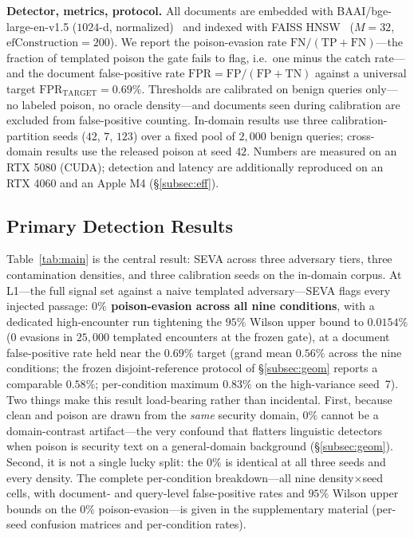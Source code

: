 \documentclass[conference]{IEEEtran}
\begin{document}
\noindent\textbf{Detector, metrics, protocol.} All documents are embedded with
BAAI/bge-large-en-v1.5 ($1024$-d, normalized)~\cite{bge} and indexed with FAISS
HNSW~\cite{faiss,hnsw} ($M=32$, $\mathrm{efConstruction}=200$). We report the
poison-evasion rate $\mathrm{FN}/(\mathrm{TP}+\mathrm{FN})$---the fraction of
templated poison the gate fails to flag, i.e.\ one minus the catch rate---and the
document false-positive rate $\mathrm{FPR}=\mathrm{FP}/(\mathrm{FP}+\mathrm{TN})$
against a universal target $\mathrm{FPR}_{\mathrm{TARGET}}=0.69\%$. Thresholds are
calibrated on benign queries only---no labeled poison, no oracle density---and
documents seen during calibration are excluded from false-positive counting.
In-domain results use three calibration-partition seeds ($42$, $7$, $123$) over a
fixed pool of $2{,}000$ benign queries; cross-domain results use the released
poison at seed $42$. Numbers are measured on an RTX 5080 (CUDA); detection and
latency are additionally reproduced on an RTX 4060 and an Apple M4
(\S\ref{subsec:eff}).

\subsection{Primary Detection Results}
\label{subsec:main}
Table~\ref{tab:main} is the central result: SEVA across three adversary tiers,
three contamination densities, and three calibration seeds on the in-domain
corpus. At L1---the full signal set against a naive templated adversary---SEVA
flags every injected passage: \textbf{$0\%$ poison-evasion across all nine
conditions}, with a dedicated high-encounter run tightening the $95\%$ Wilson upper
bound to $0.0154\%$ ($0$ evasions in $25{,}000$ templated encounters at the frozen
gate), at a document false-positive rate held near the $0.69\%$ target (grand mean
$0.56\%$ across the nine conditions; the frozen disjoint-reference protocol of
\S\ref{subsec:geom} reports a comparable $0.58\%$; per-condition maximum $0.83\%$ on the
high-variance seed~7).
Two things make this result load-bearing rather than incidental. First, because
clean and poison are drawn from the \emph{same} security domain, $0\%$ cannot be a
domain-contrast artifact---the very confound that flatters linguistic detectors
when poison is security text on a general-domain background (\S\ref{subsec:geom}).
Second, it is not a single lucky split: the $0\%$ is identical at all three seeds
and every density. The complete per-condition breakdown---all nine
density$\times$seed cells, with document- and query-level false-positive rates and
$95\%$ Wilson upper bounds on the $0\%$ poison-evasion---is given in the
supplementary material (per-seed confusion matrices and per-condition rates).
\end{document}
